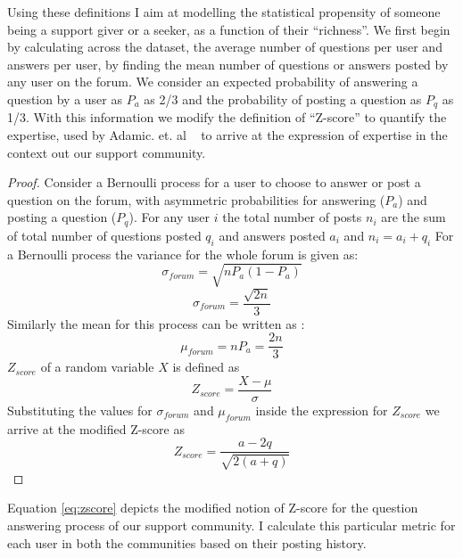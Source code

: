 Using these definitions I aim at modelling the statistical propensity of someone being a support giver or a seeker, as a function of their ``richness''. 
We first begin by calculating across the dataset, the average number of questions per user and answers per user, by finding the mean number of questions or answers posted by any user on the forum. 
We consider an expected probability of answering a question by a user as $P_a$ as 2/3 and the probability of posting a question as $P_q$ as 1/3. 
With this information we modify the definition of ``Z-score'' to quantify the expertise, used by Adamic. et. al ~\cite{zhang2007expertise} to arrive at the expression of expertise in the context out our support community. 
\begin{proof}
    Consider a Bernoulli process for a user to choose to answer or post a question on the forum, with asymmetric probabilities for answering ($P_a$) and posting a question ($P_q$). 
    For any user $i$ the total number of posts $n_i$ are the sum of total number of questions posted $q_i$ and answers posted $a_i$ and $n_i = a_i + q_i$
    For a Bernoulli process the variance for the whole forum is given as: 
     $$\sigma_{forum} = \sqrt{nP_a(1-P_a)}$$     $$\sigma_{forum} = \frac{\sqrt{2n}}{3}$$
    Similarly the mean for this process can be written as : 
    $$ \mu_{forum} = nP_a = \frac{2n}{3} $$
    $Z_{score}$ of a random variable $X$ is defined as 
    $$Z_{score} = \frac{X - \mu}{\sigma}$$
    Substituting the values for $\sigma_{forum}$ and  $\mu_{forum}$ inside the expression for $Z_{score}$ we arrive at the modified Z-score as 
    \begin{equation}
        Z_{score} = \frac{a-2q}{\sqrt{2(a+q)}}
    \label{eq:zscore}
    \end{equation}    
\end{proof}
Equation \ref{eq:zscore} depicts the modified notion of Z-score for the question answering process of our support community. I calculate this particular metric for each user in both the communities based on their posting history. 
